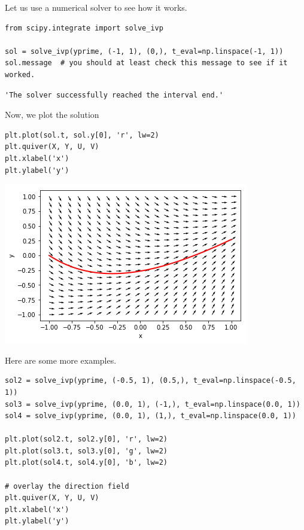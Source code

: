 \documentclass[11pt]{article}
\begin{document}
Let us use a numerical solver to see how it works.

\begin{verbatim}
from scipy.integrate import solve_ivp

sol = solve_ivp(yprime, (-1, 1), (0,), t_eval=np.linspace(-1, 1))
sol.message  # you should at least check this message to see if it worked.
\end{verbatim}

\begin{verbatim}
'The solver successfully reached the interval end.'
\end{verbatim}

Now, we plot the solution

\begin{verbatim}
plt.plot(sol.t, sol.y[0], 'r', lw=2)
plt.quiver(X, Y, U, V)
plt.xlabel('x')
plt.ylabel('y')
\end{verbatim}

\begin{center}
\includegraphics[width=.9\linewidth]{obipy-resources/05b8b46ebbc2df3b9d545d77190f5234-68311I8x.png}
\end{center}

Here are some more examples.

\begin{verbatim}
sol2 = solve_ivp(yprime, (-0.5, 1), (0.5,), t_eval=np.linspace(-0.5, 1))
sol3 = solve_ivp(yprime, (0.0, 1), (-1,), t_eval=np.linspace(0.0, 1))
sol4 = solve_ivp(yprime, (0.0, 1), (1,), t_eval=np.linspace(0.0, 1))

plt.plot(sol2.t, sol2.y[0], 'r', lw=2)
plt.plot(sol3.t, sol3.y[0], 'g', lw=2)
plt.plot(sol4.t, sol4.y[0], 'b', lw=2)

# overlay the direction field
plt.quiver(X, Y, U, V)
plt.xlabel('x')
plt.ylabel('y')
\end{verbatim}
\end{document}
